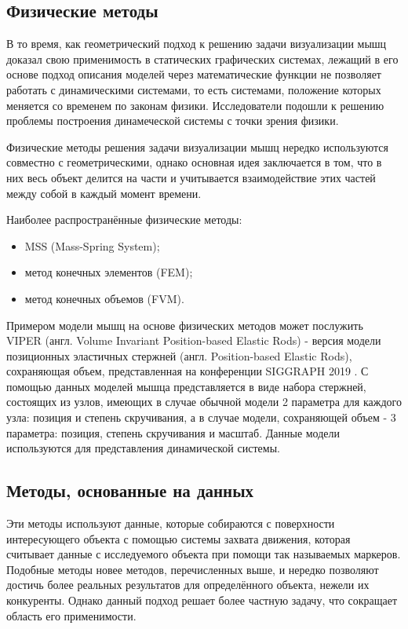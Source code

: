 \subsection{Физические методы}

В то время, как геометрический подход к решению задачи визуализации мышц доказал свою применимость в статических графических системах, лежащий в его основе подход описания моделей через математические функции не позволяет работать с динамическими системами, то есть системами, положение которых меняется со временем по законам физики\cite{cgv}. Исследователи подошли к решению проблемы построения динамеческой системы с точки зрения физики.

Физические методы решения задачи визуализации мышц нередко используются совместно с геометрическими, однако основная идея заключается в том, что в них весь объект делится на части и учитывается взаимодействие этих частей между собой в каждый момент времени.


Наиболее распространённые физические методы:
\begin{itemize}
    \item MSS (Mass-Spring System)\cite{mss};
    \item метод конечных элементов (FEM)\cite{fem1}\cite{fem2};
    \item метод конечных объемов (FVM)\cite{fvm1}\cite{fvm2}.
\end{itemize}

\label{phys}
Примером модели мышц на основе физических методов может послужить VIPER\cite{viper} (англ. Volume Invariant Position-based Elastic Rods) - версия модели позиционных эластичных стержней\cite{per} (англ. Position-based Elastic Rods), сохраняющая объем, представленная на конференции SIGGRAPH 2019 \cite{sgr}. С помощью данных моделей мышца представляется в виде набора стержней, состоящих из узлов, имеющих в случае обычной модели 2 параметра для каждого узла: позиция и степень скручивания, а в случае модели, сохраняющей объем - 3 параметра: позиция, степень скручивания и масштаб. Данные модели используются для представления динамической системы. 

\subsection{Методы, основанные на данных}

Эти методы используют данные, которые собираются с поверхности интересующего объекта с помощью системы захвата движения, которая считывает данные с исследуемого объекта при помощи так называемых маркеров. Подобные методы новее методов, перечисленных выше, и нередко позволяют достичь более реальных результатов для определённого объекта, нежели их конкуренты. Однако данный подход решает более частную задачу, что сокращает область его применимости\cite{dda}.

